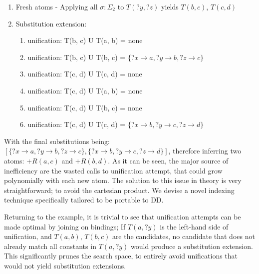 \documentclass[sigconf,screen,review,natbib]{acmart}
\theoremstyle{definition}
\begin{document}
\begin{enumerate}
\begin{enumerate}
		      \item Fresh atoms - Applying all $\sigma : \Sigma_2$ to $T(?y, ?z)$ yields $T(b, c)$, $T(c, d)$
		      \item Substitution extension: \begin{enumerate}
			            \item unification: T(b, c) U T(a, b) = none
			            \item unification: T(b, c) U T(b, c) = $\{?x \rightarrow a, ?y \rightarrow b, ?z \rightarrow c\}$
			            \item unification: T(c, d) U T(c, d) = none
			            \item unification: T(c, d) U T(a, b) = none
			            \item unification: T(c, d) U T(b, c) = none
			            \item unification: T(c, d) U T(c, d) = $\{?x \rightarrow b, ?y \rightarrow c, ?z \rightarrow d\}$
		            \end{enumerate}
	      \end{enumerate}
\end{enumerate}
With the final substitutions being: $[\{?x \rightarrow a, ?y \rightarrow b, ?z \rightarrow c\}, \{?x \rightarrow b, ?y \rightarrow c, ?z \rightarrow d\}]$, therefore inferring two atoms:
$+R(a, c)$ and $+R(b, d)$. As it can be seen, the major source of inefficiency are the wasted calls to unification attempt, that could
grow polynomially with each new atom. The solution to this issue in theory is very straightforward; to avoid the cartesian product. We
devise a novel indexing technique specifically tailored to be portable to DD.

Returning to the example, it is trivial to see that unification attempts can be made optimal by joining on bindings; If $T(a, ?y)$ is the
left-hand side of unification, and $T(a, b)$, $T(b, c)$ are the candidates, no candidate that does not already match all constants
in $T(a, ?y)$ would produce a substitution extension. This significantly prunes the search space, to entirely avoid unifications that
would not yield substitution extensions.
\end{document}
